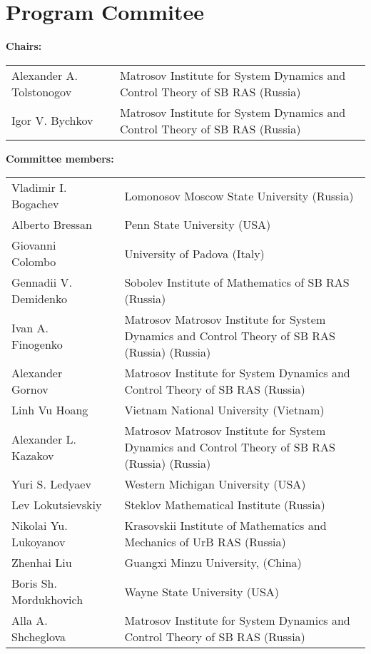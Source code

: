 \documentclass[12pt,final]{llncs}
\begin{document}
%
\vspace{-1em}
\section*{Program Commitee}
 \begin{english}

\textbf{Chairs:   }

\begin{tabular}{@{}p{6cm}@{}p{10cm}@{}}
  Alexander A. Tolstonogov &   Matrosov
Institute for System Dynamics and Control Theory of SB RAS (Russia)\\
Igor V. Bychkov &   Matrosov
Institute for System Dynamics and Control Theory of SB RAS (Russia)
\end{tabular}

\noindent\textbf{Committee members:}

\begin{tabular}{@{}p{5.5cm}@{}p{0.5cm}@{}p{10cm}@{}}
Vladimir I. Bogachev & & Lomonosov Moscow State University  (Russia)\\[0.5em]
Alberto Bressan && Penn State University (USA) \\[0.5em]
Giovanni Colombo && University of Padova (Italy)\\[0.5em]
Gennadii V. Demidenko &&  Sobolev Institute of Mathematics of SB RAS (Russia)\\[0.5em]
Ivan A. Finogenko &&  Matrosov
Matrosov  Institute for System Dynamics and Control Theory of SB RAS (Russia)  (Russia)\\[0.5em]
Alexander Gornov && Matrosov  Institute for System Dynamics and Control Theory of SB RAS (Russia) \\[0.5em]
Linh Vu Hoang && Vietnam National University (Vietnam)\\[0.5em]
Alexander L. Kazakov &&  Matrosov
Matrosov  Institute for System Dynamics and Control Theory of SB RAS (Russia) (Russia)\\[0.5em]
Yuri S. Ledyaev && Western Michigan University  (USA)	\\[0.5em]
Lev Lokutsievskiy && Steklov Mathematical Institute (Russia)\\[0.5em]
Nikolai Yu. Lukoyanov &&  Krasovskii Institute of Mathematics and Mechanics of UrB RAS (Russia)\\[0.5em]
Zhenhai Liu && Guangxi Minzu University, (China)\\[0.5em]
Boris Sh. Mordukhovich &&  Wayne State University  (USA)\\[0.5em]
Alla A. Shcheglova &&  Matrosov  Institute for System Dynamics and Control Theory of SB RAS (Russia)\\[0.5em]
\end{tabular}
\end{english}
\end{document}
